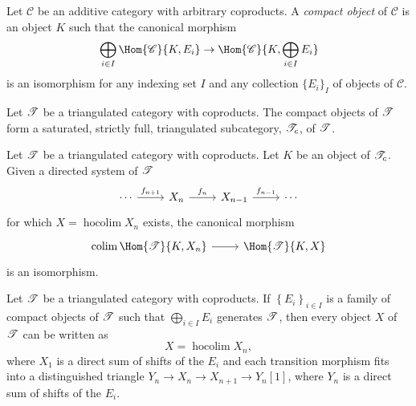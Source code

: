 \documentclass[10pt]{amsart}
\begin{document}
\begin{defn}
  Let $\mathscr{C}$ be an additive category with arbitrary coproducts.
  A {\it compact object} of $\mathscr{C}$ is an object $K$ such that the canonical morphism
  $$\bigoplus_{i \in I} \Hom{\mathscr{C}}{K, E_i} \rightarrow \Hom{\mathscr{C}}{K, \bigoplus_{i \in I}E_i}$$
  is an isomorphism for any indexing set $I$ and any collection $\{E_i\}_I$ of objects of $\mathscr{C}$.
\end{defn}

\begin{lem}
  Let $\mathscr{T}$ be a triangulated category with coproducts.
  The compact objects of $\mathscr{T}$ form a saturated, strictly full, triangulated subcategory, $\mathscr{T}_c$, of $\mathscr{T}$.
\end{lem}

\begin{lem}\label{homhocolimiscolim}
  Let $\mathscr{T}$ be a triangulated category with coproducts.
  Let $K$ be an object of $\mathscr{T}_c$.
  Given a directed system of $\mathscr{T}$
  $$\begin{tikzcd}
    \cdots \arrow{r}{f_{n+1}} & X_n \arrow{r}{f_n} & X_{n-1} \arrow{r}{f_{n-1}} & \cdots
  \end{tikzcd}$$
  for which $X = \operatorname{hocolim}X_n$ exists, the canonical morphism
  $$\begin{tikzcd}
    \operatorname{colim} \Hom{\T}{K,X_n} \arrow{r} & \Hom{\T}{K,X}
  \end{tikzcd}$$
  is an isomorphism.
\end{lem}

\begin{lem}\label{hocolim}
  Let $\mathscr{T}$ be a triangulated category with coproducts.
  If $\left\{E_i\right\}_{i \in I}$ is a family of compact objects of $\mathscr{T}$ such that $\bigoplus_{i \in I}{E_i}$ generates $\mathscr{T}$, then every object $X$ of $\mathscr{T}$ can be written as 
  $$X = \operatorname{hocolim}X_n,$$
  where $X_1$ is a direct sum of shifts of the $E_i$ and each transition morphism fits into a distinguished triangle $Y_n \rightarrow X_n \rightarrow X_{n+1} \rightarrow Y_n[1]$, where $Y_n$ is a direct sum of shifts of the $E_i$.
\end{lem}
\end{document}
